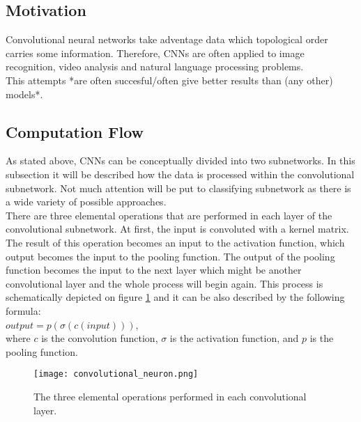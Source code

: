 \documentclass[a4paper,10pt]{report}
\begin{document}
      \subsection{Motivation} %
	Convolutional neural networks take adventage data which topological order carries some information. Therefore, CNNs are often applied to image recognition, video analysis and natural language processing problems.\\ %
	This attempts *are often succesful/often give better results than (any other) models*.\\ %
	
      
      \subsection{Computation Flow}
	As stated above, CNNs can be conceptually divided into two subnetworks. In this subsection it will be described how the data is processed within the convolutional subnetwork. Not much attention will be put to classifying subnetwork as there is a wide variety of possible approaches.\\
	
	There are three elemental operations that are performed in each layer of the convolutional subnetwork. At first, the input is convoluted with a kernel matrix. The result of this operation becomes an input to the activation function, which output becomes the input to the pooling function. The output of the pooling function becomes the input to the next layer which might be another convolutional layer and the whole process will begin again. This process is schematically depicted on figure \ref{fig:con_neur} and it can be also described by the following formula:\\
	
	$output = p(\sigma(c(input)))$,\\
	
	where $c$ is the convolution function, $\sigma$ is the activation function, and $p$ is the pooling function.\\
	
	\begin{figure}[h!]
	  \centering
	  \texttt{[image: convolutional\_neuron.png]}
	  \caption{The three elemental operations performed in each convolutional layer.}
	  \label{fig:con_neur}
	\end{figure} 
	  
\end{document}
